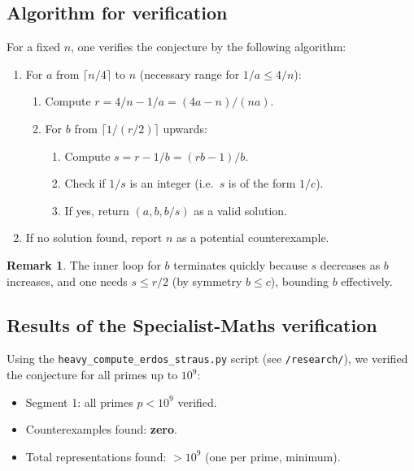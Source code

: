 \documentclass[12pt,a4paper]{amsart}
\theoremstyle{definition}
\newtheorem{remark}[theorem]{Remark}
\begin{document}
\subsection{Algorithm for verification}

For a fixed $n$, one verifies the conjecture by the following algorithm:

\begin{enumerate}
\item For $a$ from $\lceil n/4 \rceil$ to $n$ (necessary range for $1/a \leq 4/n$):
  \begin{enumerate}
  \item Compute $r = 4/n - 1/a = (4a - n)/(na)$.
  \item For $b$ from $\lceil 1/(r/2) \rceil$ upwards:
    \begin{enumerate}
    \item Compute $s = r - 1/b = (rb - 1)/b$.
    \item Check if $1/s$ is an integer (i.e.\ $s$ is of the form $1/c$).
    \item If yes, return $(a, b, b/s)$ as a valid solution.
    \end{enumerate}
  \end{enumerate}
\item If no solution found, report $n$ as a potential counterexample.
\end{enumerate}

\begin{remark}
The inner loop for $b$ terminates quickly because $s$ decreases as $b$
increases, and one needs $s \leq r/2$ (by symmetry $b \leq c$), bounding $b$
effectively.
\end{remark}

\subsection{Results of the Specialist-Maths verification}

Using the \texttt{heavy\_compute\_erdos\_straus.py} script (see
\texttt{/research/}), we verified the conjecture for all primes up to
$10^9$:

\begin{itemize}
\item Segment 1: all primes $p < 10^9$ verified.
\item Counterexamples found: \textbf{zero}.
\item Total representations found: $> 10^9$ (one per prime, minimum).
\end{itemize}
\end{document}
